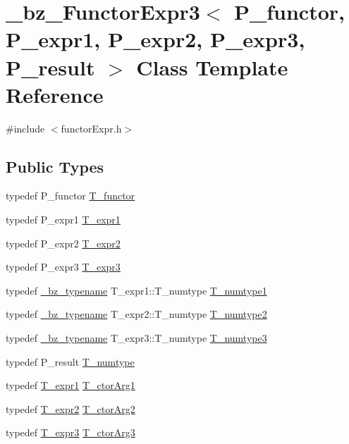 \hypertarget{class__bz__FunctorExpr3}{}\section{\+\_\+bz\+\_\+\+Functor\+Expr3$<$ P\+\_\+functor, P\+\_\+expr1, P\+\_\+expr2, P\+\_\+expr3, P\+\_\+result $>$ Class Template Reference}
\label{class__bz__FunctorExpr3}


{\ttfamily \#include $<$functor\+Expr.\+h$>$}

\subsection*{Public Types}
\begin{DoxyCompactItemize}
\item 
typedef P\+\_\+functor \hyperlink{class__bz__FunctorExpr3_aae81209846ad3b2cd702513067b9ef91}{T\+\_\+functor}
\item 
typedef P\+\_\+expr1 \hyperlink{class__bz__FunctorExpr3_a39963d1b65dfb09899113c1bcd23aad2}{T\+\_\+expr1}
\item 
typedef P\+\_\+expr2 \hyperlink{class__bz__FunctorExpr3_a942c2f518fa860c92819e1fc7a916511}{T\+\_\+expr2}
\item 
typedef P\+\_\+expr3 \hyperlink{class__bz__FunctorExpr3_a490ef6e4c6ad6c4409b53142860ebaa5}{T\+\_\+expr3}
\item 
typedef \hyperlink{compiler_8h_a1bc40add3e72effc9cf69dbe445cbdfd}{\+\_\+bz\+\_\+typename} T\+\_\+expr1\+::\+T\+\_\+numtype \hyperlink{class__bz__FunctorExpr3_a2a31b2f206352c04bcd70c865006f0f2}{T\+\_\+numtype1}
\item 
typedef \hyperlink{compiler_8h_a1bc40add3e72effc9cf69dbe445cbdfd}{\+\_\+bz\+\_\+typename} T\+\_\+expr2\+::\+T\+\_\+numtype \hyperlink{class__bz__FunctorExpr3_ac979a99f1789411afc3ee245ea556883}{T\+\_\+numtype2}
\item 
typedef \hyperlink{compiler_8h_a1bc40add3e72effc9cf69dbe445cbdfd}{\+\_\+bz\+\_\+typename} T\+\_\+expr3\+::\+T\+\_\+numtype \hyperlink{class__bz__FunctorExpr3_a4eb514374e523dd1aec4be33e908e31a}{T\+\_\+numtype3}
\item 
typedef P\+\_\+result \hyperlink{class__bz__FunctorExpr3_ad90a6f210859e4b689cd783be74ee748}{T\+\_\+numtype}
\item 
typedef \hyperlink{class__bz__FunctorExpr3_a39963d1b65dfb09899113c1bcd23aad2}{T\+\_\+expr1} \hyperlink{class__bz__FunctorExpr3_a27d00886f86094214cf7ac89fdeda5df}{T\+\_\+ctor\+Arg1}
\item 
typedef \hyperlink{class__bz__FunctorExpr3_a942c2f518fa860c92819e1fc7a916511}{T\+\_\+expr2} \hyperlink{class__bz__FunctorExpr3_acd52287918ba75a58a5e8da2a3ff9dc6}{T\+\_\+ctor\+Arg2}
\item 
typedef \hyperlink{class__bz__FunctorExpr3_a490ef6e4c6ad6c4409b53142860ebaa5}{T\+\_\+expr3} \hyperlink{class__bz__FunctorExpr3_ad40b642cbb626e49760e8f99073ee636}{T\+\_\+ctor\+Arg3}
\end{DoxyCompactItemize}
